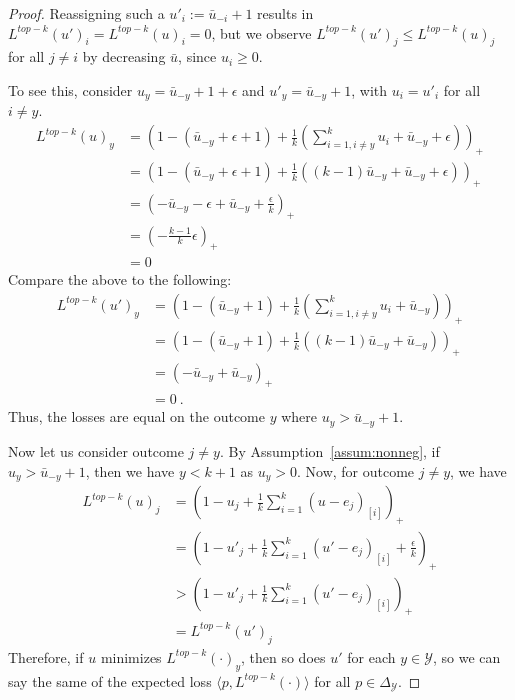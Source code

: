 \documentclass[12pt]{article}
\newcommand{\ubar}{\bar{u}}
\newcommand{\simplex}{\Delta_\Y}
\newcommand{\Y}{\mathcal{Y}}
\newcommand{\inprod}[2]{\langle #1, #2 \rangle}%
\begin{document}
\begin{proof}
	Reassigning such a $u'_i := \bar u_{-i} +1$ results in $L^{top-k}(u')_i = L^{top-k}(u)_i = 0$, but we observe $L^{top-k}(u')_j \leq L^{top-k}(u)_j$ for all $j \neq i$ by decreasing $\ubar$, since $u_i \geq 0$.

To see this, consider $u_y = \bar u_{-y} + 1 + \epsilon$ and $u'_y = \bar u_{-y} + 1$, with $u_i = u'_i$ for all $i \neq y$. 
\begin{align*}
L^{top-k}(u)_y &= \left(1 - (\bar u_{-y} + \epsilon + 1) + \frac 1 k \left(\sum_{i=1, i \neq y}^k u_i + \bar u_{-y} + \epsilon\right) \right)_+\\ 
&= \left(1 - (\bar u_{-y} + \epsilon + 1) + \frac 1 k \left((k-1) \bar u_{-y} + \bar u_{-y} + \epsilon\right) \right)_+\\
&= \left(-\bar u_{-y} - \epsilon + \bar u_{-y} + \frac \epsilon k \right)_+ \\
&= (-\frac{k-1}{k}\epsilon)_+\\
&= 0
\end{align*}
Compare the above to the following:
\begin{align*}
L^{top-k}(u')_y &= \left(1 - (\bar u_{-y} + 1) + \frac 1 k \left(\sum_{i=1, i \neq y}^k u_i + \bar u_{-y} \right) \right)_+\\ 
&= \left(1 - (\bar u_{-y} + 1) + \frac 1 k \left((k-1) \bar u_{-y} + \bar u_{-y} \right) \right)_+\\
&= \left(-\bar u_{-y} + \bar u_{-y}\right)_+ \\
&= 0~.~
\end{align*}
Thus, the losses are equal on the outcome $y$ where $u_y > \bar u_{-y} + 1$.

Now let us consider outcome $j \neq y$.
By Assumption~\ref{assum:nonneg}, if $u_y > \bar u_{-y} + 1$, then we have $y < k+1$ as $u_y > 0$.
Now, for outcome $j \neq y$, we have 
\begin{align*}
L^{top-k}(u)_j &= \left( 1 - u_j + \frac 1 k \sum_{i=1}^k (u-e_j)_{[i]} \right)_+\\
	&= \left( 1 - u'_j + \frac 1 k \sum_{i=1}^k (u'-e_j)_{[i]} + \frac {\epsilon}{k}\right)_+\\
	&> \left( 1 - u'_j + \frac 1 k \sum_{i=1}^k (u'-e_j)_{[i]}\right)_+\\
	&= L^{top-k}(u')_j
\end{align*}
Therefore, if $u$ minimizes $L^{top-k}(\cdot)_y$, then so does $u'$ for each $y \in \Y$, so we can say the same of the expected loss $\inprod{p}{L^{top-k}(\cdot)}$ for all $p \in \simplex$.
\end{proof}
\end{document}
